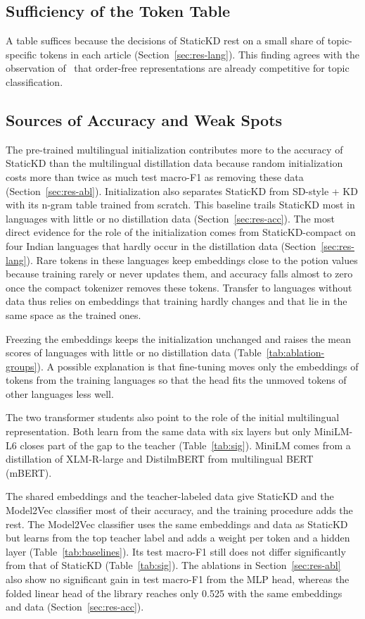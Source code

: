 \documentclass{ieeeaccess}
\begin{document}
\subsection{Sufficiency of the Token Table}
A table suffices because the decisions of StaticKD rest on a small share of topic-specific tokens in each article (Section~\ref{sec:res-lang}). This finding agrees with the observation of~\cite{galke2022bow} that order-free representations are already competitive for topic classification.

\subsection{Sources of Accuracy and Weak Spots}
The pre-trained multilingual initialization contributes more to the accuracy of StaticKD than the multilingual distillation data because random initialization costs more than twice as much test macro-F1 as removing these data (Section~\ref{sec:res-abl}). Initialization also separates StaticKD from SD-style + KD with its n-gram table trained from scratch. This baseline trails StaticKD most in languages with little or no distillation data (Section~\ref{sec:res-acc}). The most direct evidence for the role of the initialization comes from StaticKD-compact on four Indian languages that hardly occur in the distillation data (Section~\ref{sec:res-lang}). Rare tokens in these languages keep embeddings close to the potion values because training rarely or never updates them, and accuracy falls almost to zero once the compact tokenizer removes these tokens. Transfer to languages without data thus relies on embeddings that training hardly changes and that lie in the same space as the trained ones.

Freezing the embeddings keeps the initialization unchanged and raises the mean scores of languages with little or no distillation data (Table~\ref{tab:ablation-groups}). A possible explanation is that fine-tuning moves only the embeddings of tokens from the training languages so that the head fits the unmoved tokens of other languages less well.

The two transformer students also point to the role of the initial multilingual representation. Both learn from the same data with six layers but only MiniLM-L6 closes part of the gap to the teacher (Table~\ref{tab:sig}). MiniLM comes from a distillation of XLM-R-large and DistilmBERT from multilingual BERT (mBERT).

The shared embeddings and the teacher-labeled data give StaticKD and the Model2Vec classifier most of their accuracy, and the training procedure adds the rest. The Model2Vec classifier uses the same embeddings and data as StaticKD but learns from the top teacher label and adds a weight per token and a hidden layer (Table~\ref{tab:baselines}). Its test macro-F1 still does not differ significantly from that of StaticKD (Table~\ref{tab:sig}). The ablations in Section~\ref{sec:res-abl} also show no significant gain in test macro-F1 from the MLP head, whereas the folded linear head of the library reaches only 0.525 with the same embeddings and data (Section~\ref{sec:res-acc}).
\end{document}
